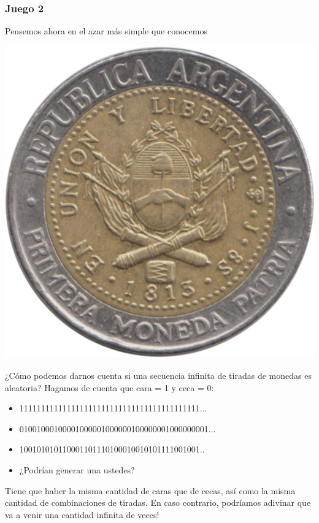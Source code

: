 \begin{frame}
\frametitle{Juego 2}
\medskip

\centering
Pensemos ahora en el azar más simple que conocemos
\pause
\begin{center}
\includegraphics[scale=0.5]{imagenes/peso.jpg}
\end{center}
¿Cómo podemos darnos cuenta si una secuencia infinita de tiradas de monedas es aleatoria?
Hagamos de cuenta que cara = 1 y ceca = 0:
\pause
\begin{itemize}
	\item 111111111111111111111111111111111111111111...
	\pause
	\item 01001000100001000001000000100000001000000001...
	\pause
	\item 100101010110001101110100010010101111001001..
	\pause
	\item ¿Podrían generar una ustedes?
\end{itemize}
Tiene que haber la misma cantidad de caras que de cecas, así como la misma cantidad de combinaciones de tiradas. En caso contrario, podríamos adivinar que va a venir una cantidad infinita de veces!
\end{frame}


